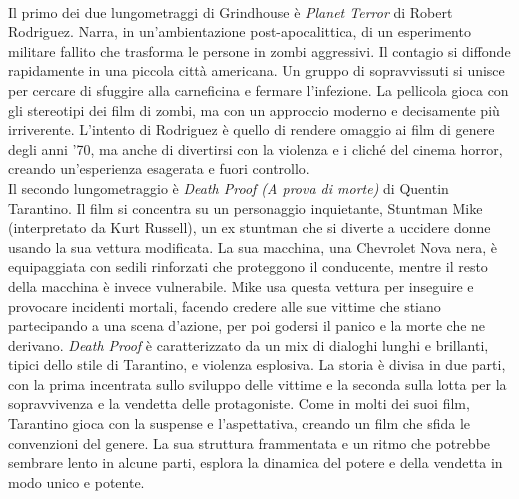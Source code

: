 \documentclass[12pt]{article} %
\begin{document}
\begin{flushleft}
    \\\vspace{1cm}
    Il primo dei due lungometraggi di Grindhouse è \textit{Planet Terror} di Robert Rodriguez. Narra, in un'ambientazione post-apocalittica, di un esperimento militare fallito che trasforma le persone in zombi aggressivi. Il contagio si diffonde rapidamente in una piccola città americana. Un gruppo di sopravvissuti si unisce per cercare di sfuggire alla carneficina e fermare l'infezione. La pellicola gioca con gli stereotipi dei film di zombi, ma con un approccio moderno e decisamente più irriverente. L'intento di Rodriguez è quello di rendere omaggio ai film di genere degli anni '70, ma anche di divertirsi con la violenza e i cliché del cinema horror, creando un'esperienza esagerata e fuori controllo.
    \\\vspace{1cm}
    Il secondo lungometraggio è \textit{Death Proof (A prova di morte)} di Quentin Tarantino. Il film si concentra su un personaggio inquietante, Stuntman Mike (interpretato da Kurt Russell), un ex stuntman che si diverte a uccidere donne usando la sua vettura modificata. 
    La sua macchina, una Chevrolet Nova nera, è equipaggiata con sedili rinforzati che proteggono il conducente, mentre il resto della macchina è invece vulnerabile. 
    Mike usa questa vettura per inseguire e provocare incidenti mortali, facendo credere alle sue vittime che stiano partecipando a una scena d'azione, per poi godersi il panico e la morte che ne derivano. 
    \textit{Death Proof} è caratterizzato da un mix di dialoghi lunghi e brillanti, tipici dello stile di Tarantino, e violenza esplosiva. 
    La storia è divisa in due parti, con la prima incentrata sullo sviluppo delle vittime e la seconda sulla lotta per la sopravvivenza e la vendetta delle protagoniste. 
    Come in molti dei suoi film, Tarantino gioca con la suspense e l'aspettativa, creando un film che sfida le convenzioni del genere. La sua struttura frammentata e un ritmo che potrebbe sembrare lento in alcune parti, esplora la dinamica del potere e della vendetta in modo unico e potente.

\end{flushleft}
\end{document}
